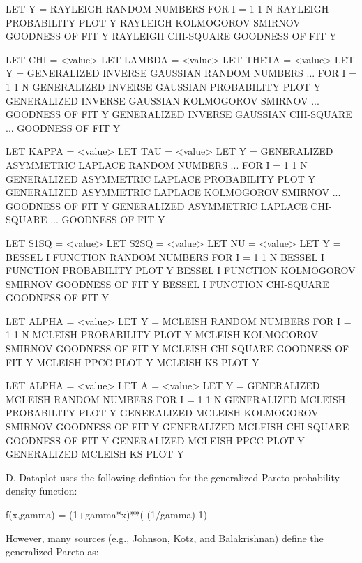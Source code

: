 {         LET Y = RAYLEIGH RANDOM NUMBERS FOR I = 1 1 N
         RAYLEIGH PROBABILITY PLOT Y
         RAYLEIGH KOLMOGOROV SMIRNOV GOODNESS OF FIT Y
         RAYLEIGH CHI-SQUARE GOODNESS OF FIT Y

         LET CHI = <value>
         LET LAMBDA = <value>
         LET THETA = <value>
         LET Y = GENERALIZED INVERSE GAUSSIAN RANDOM NUMBERS ...
                 FOR I = 1 1 N
         GENERALIZED INVERSE GAUSSIAN PROBABILITY PLOT Y
         GENERALIZED INVERSE GAUSSIAN KOLMOGOROV SMIRNOV ...
                 GOODNESS OF FIT Y
         GENERALIZED INVERSE GAUSSIAN CHI-SQUARE ...
                 GOODNESS OF FIT Y

         LET KAPPA = <value>
         LET TAU = <value>
         LET Y = GENERALIZED ASYMMETRIC LAPLACE RANDOM NUMBERS ...
                 FOR I = 1 1 N
         GENERALIZED ASYMMETRIC LAPLACE PROBABILITY PLOT Y
         GENERALIZED ASYMMETRIC LAPLACE KOLMOGOROV SMIRNOV ...
                 GOODNESS OF FIT Y
         GENERALIZED ASYMMETRIC LAPLACE CHI-SQUARE ...
                 GOODNESS OF FIT Y

         LET S1SQ = <value>
         LET S2SQ = <value>
         LET NU = <value>
         LET Y = BESSEL I FUNCTION RANDOM NUMBERS FOR I = 1 1 N
         BESSEL I FUNCTION PROBABILITY PLOT Y
         BESSEL I FUNCTION KOLMOGOROV SMIRNOV GOODNESS OF FIT Y
         BESSEL I FUNCTION CHI-SQUARE GOODNESS OF FIT Y

         LET ALPHA = <value>
         LET Y = MCLEISH RANDOM NUMBERS FOR I = 1 1 N
         MCLEISH PROBABILITY PLOT Y
         MCLEISH KOLMOGOROV SMIRNOV GOODNESS OF FIT Y
         MCLEISH CHI-SQUARE GOODNESS OF FIT Y
         MCLEISH PPCC PLOT Y
         MCLEISH KS PLOT Y

         LET ALPHA = <value>
         LET A = <value>
         LET Y = GENERALIZED MCLEISH RANDOM NUMBERS FOR I = 1 1 N
         GENERALIZED MCLEISH PROBABILITY PLOT Y
         GENERALIZED MCLEISH KOLMOGOROV SMIRNOV GOODNESS OF FIT Y
         GENERALIZED MCLEISH CHI-SQUARE GOODNESS OF FIT Y
         GENERALIZED MCLEISH PPCC PLOT Y
         GENERALIZED MCLEISH KS PLOT Y

    D. Dataplot uses the following defintion for the generalized
       Pareto probability density function:

          f(x,gamma) = (1+gamma*x)**(-(1/gamma)-1)

       However, many sources (e.g., Johnson, Kotz, and Balakrishnan)
       define the generalized Pareto as:

}
